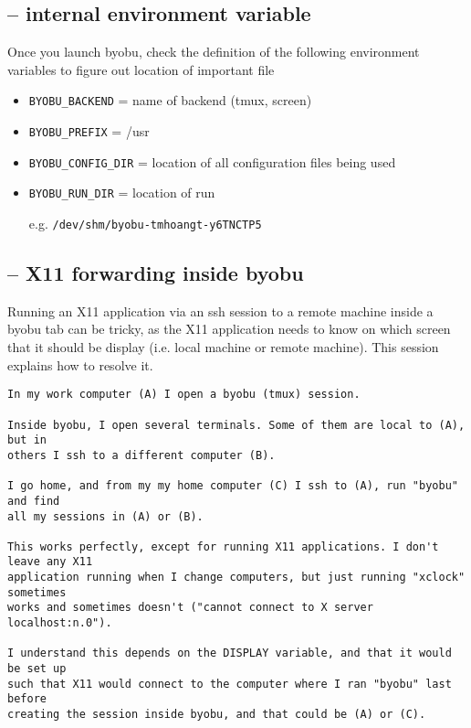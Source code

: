 \subsection{-- internal environment variable}
\label{sec:byobu-environment-variables}

Once you launch byobu, check the definition of the following environment
variables to figure out location of important file
\begin{itemize}
  \item \verb!BYOBU_BACKEND! = name of backend (tmux, screen)
  
  \item \verb!BYOBU_PREFIX! = /usr
  
  
  \item \verb!BYOBU_CONFIG_DIR! = location of all configuration files being used
  
  \item \verb!BYOBU_RUN_DIR! = location of run
  
e.g. \verb!/dev/shm/byobu-tmhoangt-y6TNCTP5!

\end{itemize}

\subsection{-- X11 forwarding inside byobu}

Running an X11 application via an ssh session to a remote machine inside a byobu
tab can be tricky, as the X11 application needs to know on which screen that it
should be display (i.e. local machine or remote machine). This session explains how
to resolve it.

\begin{verbatim}
In my work computer (A) I open a byobu (tmux) session.

Inside byobu, I open several terminals. Some of them are local to (A), but in
others I ssh to a different computer (B). 

I go home, and from my my home computer (C) I ssh to (A), run "byobu" and find
all my sessions in (A) or (B). 

This works perfectly, except for running X11 applications. I don't leave any X11
application running when I change computers, but just running "xclock" sometimes
works and sometimes doesn't ("cannot connect to X server localhost:n.0").  

I understand this depends on the DISPLAY variable, and that it would be set up
such that X11 would connect to the computer where I ran "byobu" last before
creating the session inside byobu, and that could be (A) or (C). 
\end{verbatim}

